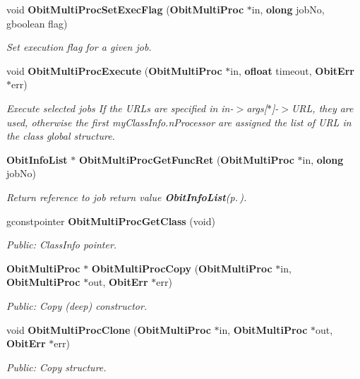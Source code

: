 \begin{CompactItemize}
void {\bf Obit\-Multi\-Proc\-Set\-Exec\-Flag} ({\bf Obit\-Multi\-Proc} $\ast$in, {\bf olong} job\-No, gboolean flag)
\begin{CompactList}\small\item\em Set execution flag for a given job. \item\end{CompactList}\item 
void {\bf Obit\-Multi\-Proc\-Execute} ({\bf Obit\-Multi\-Proc} $\ast$in, {\bf ofloat} timeout, {\bf Obit\-Err} $\ast$err)
\begin{CompactList}\small\item\em Execute selected jobs If the URLs are specified in in-$>$args[$\ast$]-$>$URL, they are used, otherwise the first my\-Class\-Info.n\-Processor are assigned the list of URL in the class global structure. \item\end{CompactList}\item 
{\bf Obit\-Info\-List} $\ast$ {\bf Obit\-Multi\-Proc\-Get\-Func\-Ret} ({\bf Obit\-Multi\-Proc} $\ast$in, {\bf olong} job\-No)
\begin{CompactList}\small\item\em Return reference to job return value {\bf Obit\-Info\-List}{\rm (p.\,\pageref{structObitInfoList})}. \item\end{CompactList}\item 
gconstpointer {\bf Obit\-Multi\-Proc\-Get\-Class} (void)
\begin{CompactList}\small\item\em Public: Class\-Info pointer. \item\end{CompactList}\item 
{\bf Obit\-Multi\-Proc} $\ast$ {\bf Obit\-Multi\-Proc\-Copy} ({\bf Obit\-Multi\-Proc} $\ast$in, {\bf Obit\-Multi\-Proc} $\ast$out, {\bf Obit\-Err} $\ast$err)
\begin{CompactList}\small\item\em Public: Copy (deep) constructor. \item\end{CompactList}\item 
void {\bf Obit\-Multi\-Proc\-Clone} ({\bf Obit\-Multi\-Proc} $\ast$in, {\bf Obit\-Multi\-Proc} $\ast$out, {\bf Obit\-Err} $\ast$err)
\begin{CompactList}\small\item\em Public: Copy structure. \item\end{CompactList}\end{CompactItemize}


